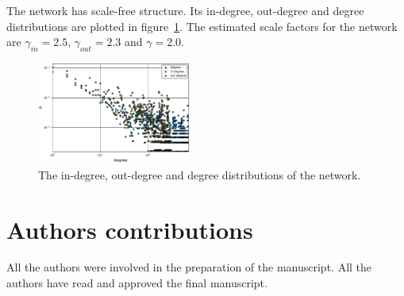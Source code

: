 The network has scale-free structure. Its in-degree, out-degree and degree
distributions are plotted in figure~\ref{fig:dist}. The estimated scale factors
for the network are $\gamma_{in} = 2.5$, $\gamma_{out} = 2.3$ and $\gamma =
2.0$. %

\begin{figure}
  \includegraphics[width=0.45\textwidth]{../plots/degree}
  \caption{The in-degree, out-degree and degree distributions of the network.}
  \label{fig:dist}
\end{figure}


\section{Authors contributions}
All the authors were involved in the preparation of the manuscript.
All the authors have read and approved the final manuscript.









